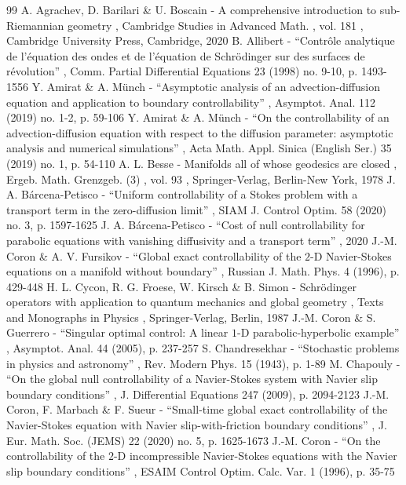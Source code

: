 \documentclass[11pt]{article}
\numberwithin{equation}{section}
\theoremstyle{definition}
\begin{document}
\begin{thebibliography}{99}
 A. Agrachev, D. Barilari \& U. Boscain - A comprehensive introduction to sub-Riemannian geometry , Cambridge Studies in Advanced Math. , vol. 181 , Cambridge University Press, Cambridge, 2020
 B. Allibert - “Contrôle analytique de l’équation des ondes et de l’équation de Schrödinger sur des surfaces de révolution” , Comm. Partial Differential Equations 23 (1998) no. 9-10, p. 1493-1556
 Y. Amirat \& A. Münch - “Asymptotic analysis of an advection-diffusion equation and application to boundary controllability” , Asymptot. Anal. 112 (2019) no. 1-2, p. 59-106
 Y. Amirat \& A. Münch - “On the controllability of an advection-diffusion equation with respect to the diffusion parameter: asymptotic analysis and numerical simulations” , Acta Math. Appl. Sinica (English Ser.) 35 (2019) no. 1, p. 54-110
 A. L. Besse - Manifolds all of whose geodesics are closed , Ergeb. Math. Grenzgeb. (3) , vol. 93 , Springer-Verlag, Berlin-New York, 1978
 J. A. Bárcena-Petisco - “Uniform controllability of a Stokes problem with a transport term in the zero-diffusion limit” , SIAM J. Control Optim. 58 (2020) no. 3, p. 1597-1625
 J. A. Bárcena-Petisco - “Cost of null controllability for parabolic equations with vanishing diffusivity and a transport term” , 2020
 J.-M. Coron \& A. V. Fursikov - “Global exact controllability of the $2$-D Navier-Stokes equations on a manifold without boundary” , Russian J. Math. Phys. 4 (1996), p. 429-448
 H. L. Cycon, R. G. Froese, W. Kirsch \& B. Simon - Schrödinger operators with application to quantum mechanics and global geometry , Texts and Monographs in Physics , Springer-Verlag, Berlin, 1987
 J.-M. Coron \& S. Guerrero - “Singular optimal control: A linear $1$-D parabolic-hyperbolic example” , Asymptot. Anal. 44 (2005), p. 237-257
 S. Chandresekhar - “Stochastic problems in physics and astronomy” , Rev. Modern Phys. 15 (1943), p. 1-89
 M. Chapouly - “On the global null controllability of a Navier-Stokes system with Navier slip boundary conditions” , J. Differential Equations 247 (2009), p. 2094-2123
 J.-M. Coron, F. Marbach \& F. Sueur - “Small-time global exact controllability of the Navier-Stokes equation with Navier slip-with-friction boundary conditions” , J. Eur. Math. Soc. (JEMS) 22 (2020) no. 5, p. 1625-1673
 J.-M. Coron - “On the controllability of the $2$-D incompressible Navier-Stokes equations with the Navier slip boundary conditions” , ESAIM Control Optim. Calc. Var. 1 (1996), p. 35-75

\end{thebibliography}
\end{document}

